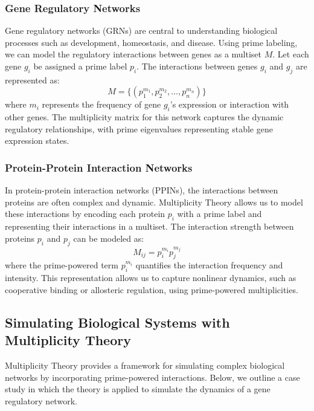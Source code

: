 \documentclass[%
 preprint, linenumbers,
 amsmath,amssymb,
 aps, physrev,
]{revtex4-2}
\begin{document}
\subsubsection{Gene Regulatory Networks}
Gene regulatory networks (GRNs) are central to understanding biological processes such as development, homeostasis, and disease. Using prime labeling, we can model the regulatory interactions between genes as a multiset \( M \). Let each gene \( g_i \) be assigned a prime label \( p_i \). The interactions between genes \( g_i \) and \( g_j \) are represented as:
\[
M = \{ (p_1^{m_1}, p_2^{m_2}, \dots, p_n^{m_n}) \}
\]
where \( m_i \) represents the frequency of gene \( g_i \)'s expression or interaction with other genes. The multiplicity matrix for this network captures the dynamic regulatory relationships, with prime eigenvalues representing stable gene expression states.

\subsubsection{Protein-Protein Interaction Networks}
In protein-protein interaction networks (PPINs), the interactions between proteins are often complex and dynamic. Multiplicity Theory allows us to model these interactions by encoding each protein \( p_i \) with a prime label and representing their interactions in a multiset. The interaction strength between proteins \( p_i \) and \( p_j \) can be modeled as:
\[
M_{ij} = p_i^{m_i} p_j^{m_j}
\]
where the prime-powered term \( p_i^{m_i} \) quantifies the interaction frequency and intensity. This representation allows us to capture nonlinear dynamics, such as cooperative binding or allosteric regulation, using prime-powered multiplicities.

\subsection{Simulating Biological Systems with Multiplicity Theory}
Multiplicity Theory provides a framework for simulating complex biological networks by incorporating prime-powered interactions. Below, we outline a case study in which the theory is applied to simulate the dynamics of a gene regulatory network.
\end{document}
